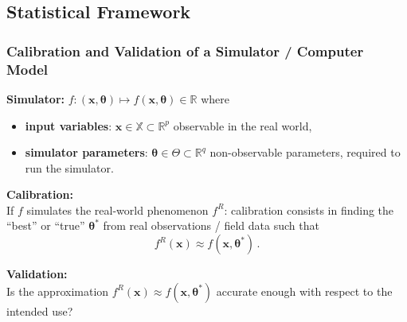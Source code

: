 \documentclass[nopagenumber,9pt]{beamer}
\newcommand{\btheta}{\boldsymbol{\theta}}
\newcommand{\bx}{\mathbf{x}}
\begin{document}
\subsection{Statistical Framework}
\begin{frame}
 \frametitle{Calibration and Validation of a Simulator / Computer Model}
 
 \textbf{Simulator:}
$f:(\bx,\btheta)\mapsto f(\bx,\btheta)\in \mathbb{R} $ where\\
\medskip
\begin{itemize}
  \item \textbf{input variables}: $\bx\in  \mathbb{X}\subset\mathbb{R}^p$ observable  in the real world,
  \smallskip
  \item \textbf{simulator parameters}: $\btheta\in \Theta\subset\mathbb{R}^q$ non-observable parameters, required to run the simulator.
\smallskip
  
\end{itemize}

  \bigskip
  
%   
  
  
  \textbf{Calibration:}\\
  If $f$ simulates 
  the real-world phenomenon $f^R$:   
  calibration consists in finding the ``best'' or ``true'' $\btheta^*$ from real observations / field data such that
  $$f^R(\bx)\approx f(\bx,\btheta^*)\,.$$

  
  \textbf{Validation:}\\
  Is the approximation $f^R(\bx)\approx f(\bx,\btheta^*)$ accurate enough with respect to the intended use?
  
  
  
\end{frame}
\end{document}
